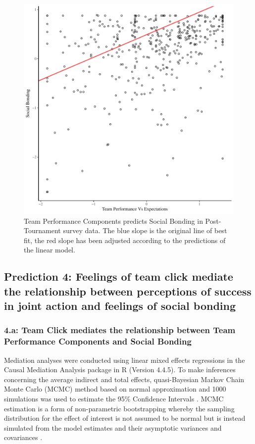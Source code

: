 \begin{CJK}{UTF8}{gbsn}
   \begin{figure}[htbp]
     \centering
   \includegraphics[scale=.5]{images/teamPerfBondOverallModelSlope.pdf}
     \caption{Team Performance Components predicts Social Bonding in Post-Tournament survey data. The blue slope is the original line of best fit, the red slope has been adjusted according to the predictions of the linear model.}
     \label{fig:teamPerfBondOverallModelSlope}
   \end{figure}



\subsection{Prediction 4: Feelings of team click mediate the relationship between perceptions of success in joint action and feelings of social bonding}

  \subsubsection{4.a: Team Click mediates the relationship between Team Performance Components and Social Bonding}

  Mediation analyses were conducted using linear mixed effects regressions in the Causal Mediation Analysis package in R (Version 4.4.5).  To make inferences concerning the average indirect and total effects, quasi-Bayesian Markov Chain Monte Carlo (MCMC) method based on normal approximation and 1000 simulations was used to estimate the 95\% Confidence Intervals \citep{Tofighi2016a,Imai2010}. MCMC estimation is a form of non-parametric bootstrapping whereby the sampling distribution for the effect of interest is not assumed to be normal but is instead simulated from the model estimates and their asymptotic variances and covariances \cite{Preacher2008}.


\end{CJK}
